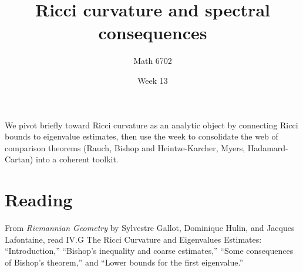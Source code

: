 \documentclass{article}
\title{Ricci curvature and spectral consequences}
\author{Math 6702}
\date{Week 13}
\begin{document}
\maketitle

We pivot briefly toward Ricci curvature as an analytic object by connecting Ricci bounds to eigenvalue estimates, then use the week to consolidate the web of comparison theorems (Rauch, Bishop and Heintze-Karcher, Myers, Hadamard-Cartan) into a coherent toolkit.

\section*{Reading}
From \textit{Riemannian Geometry} by Sylvestre Gallot, Dominique Hulin, and Jacques Lafontaine, read \textsection IV.G The Ricci Curvature and Eigenvalues Estimates: ``Introduction,'' ``Bishop's inequality and coarse estimates,'' ``Some consequences of Bishop's theorem,'' and ``Lower bounds for the first eigenvalue.''
\end{document}
